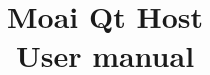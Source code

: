 \documentclass[a4paper, 12pt]{report}
\begin{document}
\title{Moai Qt Host \\ User manual}

\maketitle

\tableofcontents





\end{document}
